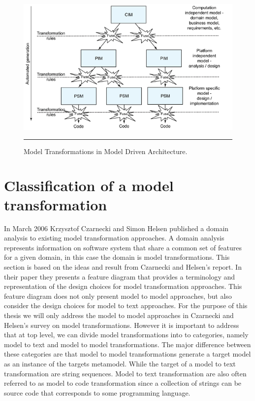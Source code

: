 \begin{figure}[H]
  \centering
    \includegraphics[scale=0.8]{./Figures/MDA_MDE.png}
    \rule{35em}{0.5pt}
  \caption[Model Transformations in MDA]
  				{Model Transformations in Model Driven Architecture.}
  \label{fig:MDE_MDA_MT}
\end{figure}


\section{Classification of a model transformation}

In March 2006 Krzysztof Czarnecki and Simon Helsen published a domain analysis
to existing model transformation approaches\cite{Czarnecki2006}. A domain
analysis represents information on software system that share a common set of
features for a given domain\cite{FODA,Prieto-Diaz1990}, in this case the domain
is model transformations. This section is based on the ideas and result from
Czarnecki and Helsen's report. In their paper they presents a feature diagram
that provides a terminology and representation of the design choices for model
transformation approaches. This feature diagram does not only present model to
model approaches, but also consider the design choices for model to text
approaches. For the purpose of this thesis we will only address the model to
model approaches in Czarnecki and Helsen's survey on model transformations.
However it is important to address that at top level, we can divide model
transformations into to categories, namely model to text and model to model
transformations. The major difference between these categories are that model to
model transformations generate a target model as an instance of the targets
metamodel. While the target of a model to text transformation are string
sequences. Model to text transformation are also often referred to as model to
code transformation since a collection of strings can be source code that
corresponds to some programming language. 

